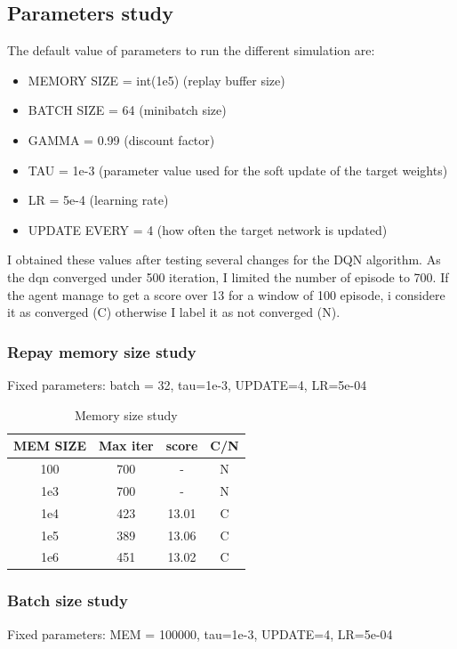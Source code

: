 \documentclass[12pt]{article}
\begin{document}
\subsection{Parameters study}
The default value of parameters to run the different simulation are:
\begin{itemize}
\item MEMORY SIZE = int(1e5) (replay buffer size)
\item BATCH SIZE = 64  (minibatch size)
\item GAMMA = 0.99  (discount factor)
\item TAU = 1e-3  (parameter value used for the soft update of the target weights)
\item LR = 5e-4  (learning rate)
\item UPDATE EVERY = 4  (how often the target network is updated)
\end{itemize}

I obtained these values after testing several changes for the DQN algorithm.
As the dqn converged under 500 iteration, I limited the number of episode to 700. If the agent manage to get a score over 13 for a window of 100 episode, i considere it as converged (C) otherwise I label it as not converged (N). 


\subsubsection{Repay memory size study}
Fixed parameters: batch = 32, tau=1e-3, UPDATE=4, LR=5e-04

\begin{table}[!htbp]
\centering
\begin{tabular}{|c|c|c|c|}
\hline 
{ \textbf{MEM SIZE}} & { \textbf{Max iter}} & { \textbf{score}} & { \textbf{C/N}} \\ \hline
100 & 700 & -     & N \\ \hline
1e3 & 700 & -     & N \\ \hline
1e4 & 423 & 13.01 & C \\ \hline
1e5 & 389 & 13.06 & C \\ \hline
1e6 & 451 & 13.02 & C \\ \hline
\end{tabular}
\caption{Memory size study}
\label{tab:MEM}
\end{table}


\subsubsection{Batch size study}
Fixed parameters: MEM = 100000, tau=1e-3, UPDATE=4, LR=5e-04
\end{document}

